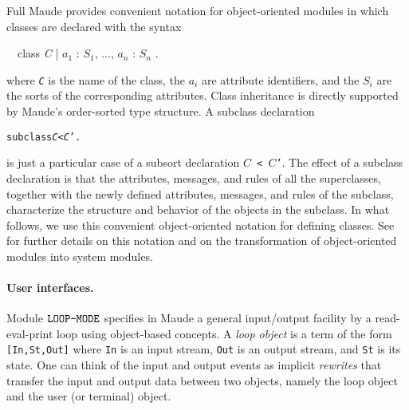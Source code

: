 
Full Maude provides convenient notation for object-oriented modules in which classes are declared with
the syntax 
{\small \ttfamily
\begin{tabbing}
\ \ class \textit{C} | \(\textit{a}_1\) : \(\textit{S}_1\), ..., \(\textit{a}_n\) : \(\textit{S}_n\) .
\end{tabbing}
\rmfamily}
\noindent where \texttt{\textit{C}} is the name of the class,
the \texttt{\(\textit{a}_i\)} are attribute identifiers, and the \texttt{\(\textit{S}_i\)} are the sorts of the corresponding
attributes. Class inheritance is directly supported by Maude's order-sorted type structure.
A subclass declaration
{\small
\begin{alltt}
  subclass \textit{C} < \textit{C}' .
\end{alltt}
}
\noindent is just a particular case of a subsort
declaration \texttt{\(\textit{C}\) < \(\textit{C}\)'}. The effect of a subclass declaration is that the attributes,
messages, and rules of all the superclasses, together with the newly defined
attributes, messages, and rules of the subclass, characterize the structure and
behavior of the objects in the subclass.
In what follows, we use this convenient object-oriented notation for defining classes.
See~\cite{CDELMMT:2007-book} for further details on this notation and on the 
transformation of object-oriented modules into system modules. 

\paragraph{\bf User interfaces.}
Module $\text{\tt LOOP-MODE}$ specifies in Maude
a general input/output facility by a read-eval-print loop
using object-based concepts.
A {\em loop object} is a term of the form \verb~[In,St,Out]~ where
\verb~In~ is an input stream, \verb~Out~ is an output stream, and 
\verb~St~ is its state. 
One can think
of the input and output events as implicit {\em rewrites} that transfer
the input and output data between two objects, namely the loop object
and the user (or terminal) object.

